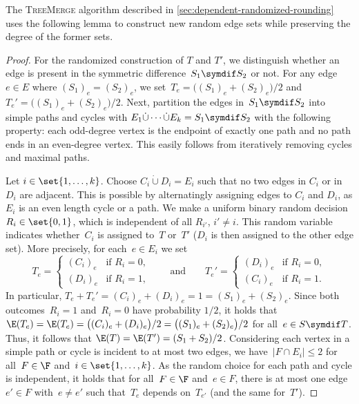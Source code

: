 The \textsc{TreeMerge} algorithm described in \cref{sec:dependent-randomized-rounding} uses the following lemma to construct new random edge sets while preserving the degree of the former sets.

\EdgeSetDecomposition*

\begin{proof}
    For the randomized construction of $T$ and $T'$, we distinguish whether an edge is present in the symmetric difference~$S_1 \symdif S_2$ or not.
    For any edge~$e \in E$ where $(S_1)_e = (S_2)_e$, we set~$T_e = \big((S_1)_e + (S_2)_e \big)/2$ and~$T_e' = \big((S_1)_e + (S_2)_e \big)/2$.
    Next, partition the edges in~$S_1 \symdif S_2$ into simple paths and cycles with $E_1\dot\cup \cdots \dot\cup E_k = S_1 \symdif S_2$ with the following property: each odd-degree vertex is the endpoint of exactly one path and no path ends in an even-degree vertex.
    This easily follows from iteratively removing cycles and maximal paths.

    Let $i\in\set{1,\dotsc,k}$. Choose $C_i \dot\cup D_i = E_i$ such that no two edges in $C_i$ or in $D_i$ are adjacent. This is possible by alternatingly assigning edges to $C_i$ and $D_i$, as $E_i$ is an even length cycle or a path.
    We make a uniform binary random decision $R_{i} \in \set{0,1}$, which is independent of all $R_{i'}$, $i'\neq i$.
    This random variable indicates whether~$C_i$ is assigned to~$T$ or~$T'$ ($D_i$ is then assigned to the other edge set).
    More precisely, for each~$e \in E_i$ we set 
    \begin{equation}
        \label{eq:mom-random-matching-choice-for-pair}
        T_e = 
        \begin{cases}
            (C_i)_e & \text{if } R_{i} = 0, \\
            (D_i)_e & \text{if } R_{i} = 1,
        \end{cases}
        \qquad \text{and} \qquad 
        T_e' = 
        \begin{cases}
            (D_i)_e & \text{if } R_{i} = 0, \\
            (C_i)_e & \text{if } R_{i} = 1.
        \end{cases}
    \end{equation}
    In particular, $T_e + T_e' = (C_i)_e + (D_i)_e = 1 = (S_1)_e + (S_2)_e$.
    Since both outcomes~$R_i = 1$ and~$R_i = 0$ have probability $1/2$, it holds that $\E(T_e) = \E(T_e) = \big((C_i)_e + (D_i)_e \big)/2 = \big((S_1)_e + (S_2)_e \big)/2$ for all~$e \in S \symdif T$.
    Thus, it follows that $\E(T) = \E(T') = (S_1+S_2)/2$.
    Considering each vertex in a simple path or cycle is incident to at most two edges, we have~$| F \cap E_i| \le 2$ for all~$F \in \F$ and~$i \in \set{1, \dotsc, k}$.
    As the random choice for each path and cycle is independent, it holds that for all~$F \in \F$ and~$e \in F$, there is at most one edge~$e' \in F$ with~$e \neq e'$ such that~$T_e$ depends on~$T_{e'}$ (and the same for~$T'$).
    

\end{proof}
